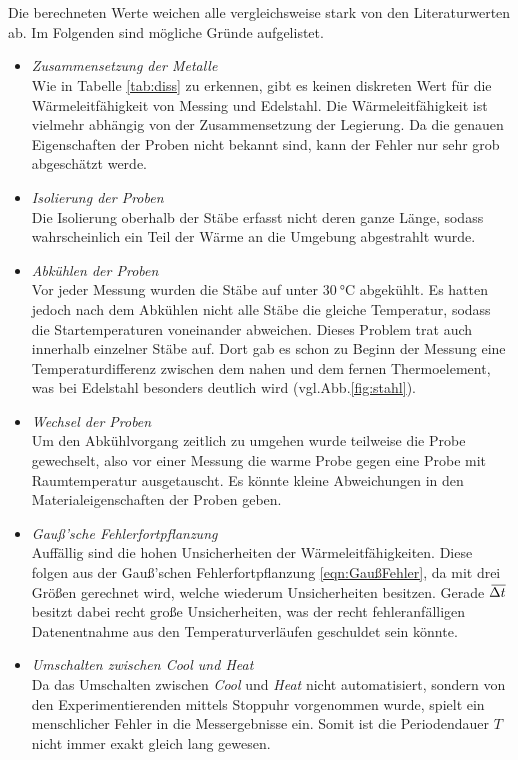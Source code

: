 \\
\\
\noindent
Die berechneten Werte weichen alle vergleichsweise stark von den Literaturwerten ab. Im Folgenden sind mögliche Gründe aufgelistet.
\begin{itemize}
    \item \textit{Zusammensetzung der Metalle}\\
    Wie in Tabelle \ref{tab:diss} zu erkennen, gibt es keinen diskreten Wert für die Wärmeleitfähigkeit von Messing und Edelstahl. Die
    Wärmeleitfähigkeit ist vielmehr abhängig von der Zusammensetzung der Legierung. Da die genauen Eigenschaften der Proben nicht bekannt
    sind, kann der Fehler nur sehr grob abgeschätzt werde.
    \item \textit{Isolierung der Proben}\\
    Die Isolierung oberhalb der Stäbe erfasst nicht deren ganze Länge, sodass wahrscheinlich ein Teil der Wärme an die Umgebung abgestrahlt wurde.
    \item \textit{Abkühlen der Proben}\\
    Vor jeder Messung wurden die Stäbe auf unter $\SI{30}{\celsius}$ abgekühlt. Es hatten jedoch nach dem Abkühlen nicht alle Stäbe die gleiche
    Temperatur, sodass die Startemperaturen voneinander abweichen. Dieses Problem trat auch innerhalb einzelner Stäbe auf. Dort gab es schon
    zu Beginn der Messung eine Temperaturdifferenz zwischen dem nahen und dem fernen Thermoelement, was bei Edelstahl besonders deutlich wird
    (vgl.Abb.\ref{fig:stahl}).
    \item \textit{Wechsel der Proben}\\
    Um den Abkühlvorgang zeitlich zu umgehen wurde teilweise die Probe gewechselt, also vor einer Messung die warme Probe gegen eine Probe
    mit Raumtemperatur ausgetauscht. Es könnte kleine Abweichungen in den Materialeigenschaften der Proben geben.
    \item \textit{Gauß'sche Fehlerfortpflanzung}\\
    Auffällig sind die hohen Unsicherheiten der Wärmeleitfähigkeiten. Diese folgen aus der Gauß'schen Fehlerfortpflanzung \eqref{eqn:GaußFehler},
    da mit drei Größen gerechnet wird, welche wiederum Unsicherheiten besitzen. Gerade $\,\overline{\!{\Delta t}}$ besitzt dabei recht große Unsicherheiten,
    was der recht fehleranfälligen Datenentnahme aus den Temperaturverläufen geschuldet sein könnte.
    \item \textit{Umschalten zwischen Cool und Heat}\\
    Da das Umschalten zwischen \textit{Cool} und \textit{Heat} nicht automatisiert, sondern von den Experimentierenden mittels Stoppuhr vorgenommen wurde,
    spielt ein menschlicher Fehler in die Messergebnisse ein. Somit ist die Periodendauer $T$ nicht immer exakt gleich lang gewesen.
\end{itemize}
